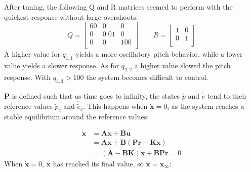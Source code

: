 After tuning, the following Q and R matrices seemed to perform with
the quickest response without large overshoots:
\begin{equation}
  Q =
  \begin{bmatrix}
    60 & 0   & 0 \\
    0  & 0.01 & 0 \\
    0  & 0   & 100 \\
  \end{bmatrix}
  \qquad
  R =
  \begin{bmatrix}
    1 & 0 \\
    0 & 1 \\
  \end{bmatrix}
\end{equation}
A higher value for $q_{1,1}$ yields a more oscillatory pitch behavior,
while a lower value yields a slower response. As for $q_{2,2}$ a
higher value slowed the pitch response. With $q_{3,3} > 100$ the
system becomes difficult to control.

$\boldsymbol{P}$ is defined such that as time goes to infinity, the
states $\tilde{p}$ and $\dot{\tilde{e}}$ tend to their reference
values $\tilde{p}_c$ and $\dot{\tilde{e}}_c$. This happens when
$\dot{\boldsymbol{x}} = 0$, as the system reaches a stable equilibrium
around the reference values:

\begin{align*}
  \dot{\boldsymbol{x}} &= \boldsymbol{Ax} + \boldsymbol{Bu} \\
                       &= \boldsymbol{Ax} +
                         \boldsymbol{B}(\boldsymbol{Pr} -
                         \boldsymbol{Kx}) \\
                       &= (\boldsymbol{A}-\boldsymbol{BK})\boldsymbol{x}
                         + \boldsymbol{BPr} = 0
\end{align*}
When $\boldsymbol{\dot{x}} = 0$, $\boldsymbol{x}$ has reached its
final value, so $\boldsymbol{x} = \boldsymbol{x_\infty}$:

